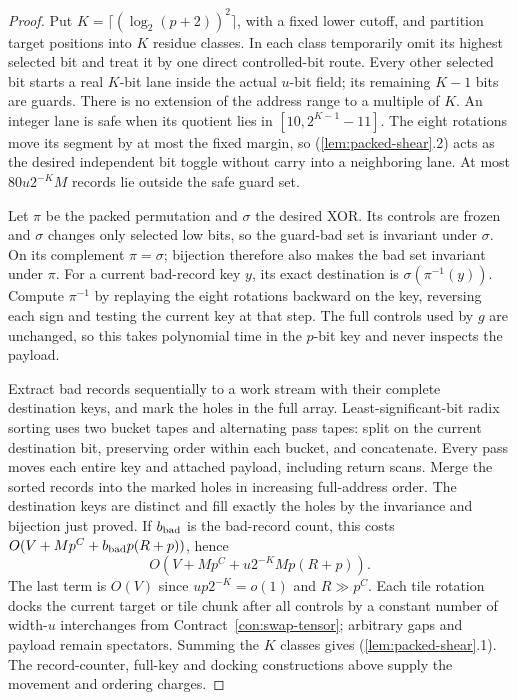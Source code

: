 \begin{proof}
Put $K=\lceil(\log_2(p+2))^2\rceil$, with a fixed lower cutoff, and partition target positions into $K$ residue classes. In each class temporarily omit its highest selected bit and treat it by one direct controlled-bit route. Every other selected bit starts a real $K$-bit lane inside the actual $u$-bit field; its remaining $K-1$ bits are guards. There is no extension of the address range to a multiple of $K$. An integer lane is safe when its quotient lies in $[10,2^{K-1}-11]$. The eight rotations move its segment by at most the fixed margin, so (\ref{lem:packed-shear}.2) acts as the desired independent bit toggle without carry into a neighboring lane. At most $80u2^{-K}M$ records lie outside the safe guard set.

Let $\pi$ be the packed permutation and $\sigma$ the desired XOR. Its controls are frozen and $\sigma$ changes only selected low bits, so the guard-bad set is invariant under $\sigma$. On its complement $\pi=\sigma$; bijection therefore also makes the bad set invariant under $\pi$. For a current bad-record key $y$, its exact destination is $\sigma(\pi^{-1}(y))$. Compute $\pi^{-1}$ by replaying the eight rotations backward on the key, reversing each sign and testing the current key at that step. The full controls used by $g$ are unchanged, so this takes polynomial time in the $p$-bit key and never inspects the payload.

Extract bad records sequentially to a work stream with their complete destination keys, and mark the holes in the full array. Least-significant-bit radix sorting uses two bucket tapes and alternating pass tapes: split on the current destination bit, preserving order within each bucket, and concatenate. Every pass moves each entire key and attached payload, including return scans. Merge the sorted records into the marked holes in increasing full-address order. The destination keys are distinct and fill exactly the holes by the invariance and bijection just proved. If $b_{\rm bad}$ is the bad-record count, this costs $O(V+Mp^C+b_{\rm bad}p(R+p))$, hence
\[
 O\!\left(V+Mp^C+u2^{-K}Mp(R+p)\right).
\]
The last term is $O(V)$ since $up2^{-K}=o(1)$ and $R\gg p^C$. Each tile rotation docks the current target or tile chunk after all controls by a constant number of width-$u$ interchanges from Contract~\ref{con:swap-tensor}; arbitrary gaps and payload remain spectators. Summing the $K$ classes gives (\ref{lem:packed-shear}.1). The record-counter, full-key and docking constructions above supply the movement and ordering charges.\end{proof}

